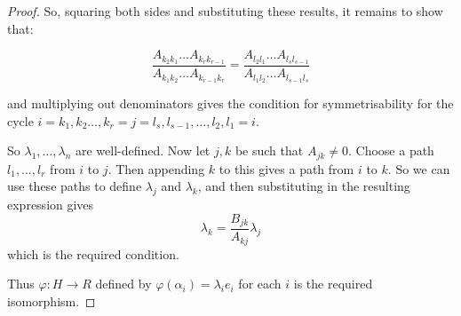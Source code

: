 \documentclass[10pt,a4paper]{amsart}
\begin{document}
\begin{proof}
So, squaring both sides and substituting these results, it remains to show that:

\begin{equation*} \dfrac{A_{k_2k_1}\ldots A_{k_rk_{r-1}}}{A_{k_1 k_2} \ldots A_{k_{r-1} k_r}}= \dfrac{A_{l_2l_1} \ldots A_{l_s l_{s-1}}}{A_{l_1 l_2} \ldots A_{l_{s-1} l_s}}\end{equation*}

and multiplying out denominators gives the condition for symmetrisability for the cycle $i = k_1, k_2 \ldots, k_r = j = l_s, l_{s-1}, \ldots, l_2, l_1 = i$. 

So $\lambda_1, \ldots, \lambda_n$ are well-defined. Now let $j, k$ be such that $A_{jk} \neq 0$. Choose a path $l_1, \ldots, l_r$ from $i$ to $j$. Then appending $k$ to this gives a path from $i$ to $k$. So we can use these paths to define $\lambda_j$ and $\lambda_k$, and then substituting in the resulting expression gives \begin{equation*}\lambda_k = \frac{B_{jk}}{A_{kj}} \lambda_j\end{equation*} which is the required condition.

Thus $\varphi: H \to R$ defined by $\varphi(\alpha_i) = \lambda_i e_i$ for each $i$ is the required isomorphism. \end{proof}
\end{document}

